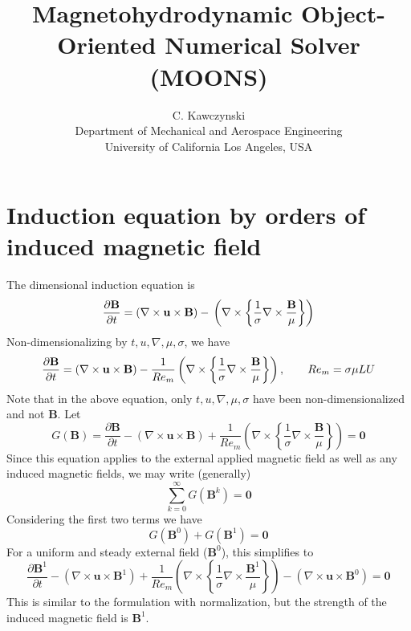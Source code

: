 \documentclass[11pt]{article}
\newcommand{\B}{\mathbf{B}}
\newcommand{\U}{\mathbf{u}}
\newcommand{\PD}{\partial}
\begin{document}
\doublespacing
\title{Magnetohydrodynamic Object-Oriented Numerical Solver (MOONS)}
\author{C. Kawczynski \\
Department of Mechanical and Aerospace Engineering \\
University of California Los Angeles, USA\\
}

\section{Induction equation by orders of induced magnetic field}
The dimensional induction equation is
\begin{equation} \label{eq:ind_dim}
  \frac{\PD \B}{\PD t} 
  =
  (\nabla \times \U \times \B)
  - \\
  \left(
  \nabla \times
  \left\{
  \frac{1}{\sigma}
  \nabla \times
  \frac{\B}{\mu}
  \right\}
  \right)
\end{equation}
Non-dimensionalizing by $t,u,\nabla , \mu, \sigma$, we have
\begin{equation} \label{eq:ind}
  \frac{\PD \B}{\PD t} 
  =
  (\nabla \times \U \times \B)
  - \\
  \frac{1}{Re_m}
  \left(
  \nabla \times
  \left\{
  \frac{1}{\sigma}
  \nabla \times
  \frac{\B}{\mu}
  \right\}
  \right)
  ,\qquad Re_m = \sigma \mu LU
\end{equation}
Note that in the above equation, only $t,u,\nabla , \mu, \sigma$ have been non-dimensionalized and not $\B$. Let
\begin{equation}
  G(\B)
  =
  \frac{\PD \B}{\PD t} 
  -
  (\nabla \times \U \times \B)
  +
  \frac{1}{Re_m}
  \left(
  \nabla \times
  \left\{
  \frac{1}{\sigma}
  \nabla \times
  \frac{\B}{\mu}
  \right\}
  \right)
  =
  \mathbf{0}
\end{equation}
Since this equation applies to the external applied magnetic field as well as any induced magnetic fields, we may write (generally)
\begin{equation}
	\sum_{k=0}^{\infty} G(\B^k)
	=
	\mathbf{0}
\end{equation}
Considering the first two terms we have
\begin{equation}
  G(\B^0)
  +
  G(\B^1)
  =
  \mathbf{0}
\end{equation}
For a uniform and steady external field ($\B^0$), this simplifies to
\begin{equation}
  \frac{\PD \B^1}{\PD t} 
  -
  (\nabla \times \U \times \B^1)
  +
  \frac{1}{Re_m}
  \left(
  \nabla \times
  \left\{
  \frac{1}{\sigma}
  \nabla \times
  \frac{\B^1}{\mu}
  \right\}
  \right)
  -
  (\nabla \times \U \times \B^0)
  =
  \mathbf{0}
\end{equation}
This is similar to the formulation with normalization, but the strength of the induced magnetic field is $\B^1$.
\end{document}
